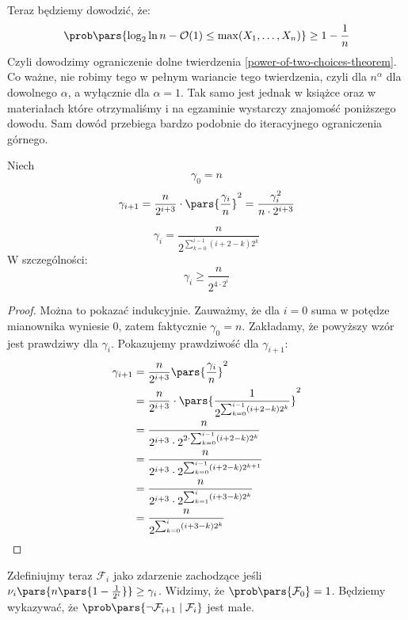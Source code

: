 Teraz będziemy dowodzić, że:
\[
	\prob\pars{\log_2\ln n - \mathcal{O}(1) \leq \max(X_1, \ldots, X_n)} \geq 1 - \frac{1}{n}
\]
Czyli dowodzimy ograniczenie dolne twierdzenia \ref{power-of-two-choices-theorem}. Co ważne, nie robimy tego w pełnym wariancie tego twierdzenia, czyli dla \(n^\alpha\) dla dowolnego \(\alpha\), a wyłącznie dla \(\alpha = 1\). Tak samo jest jednak w książce oraz w materiałach które otrzymaliśmy i na egzaminie wystarczy znajomość poniższego dowodu. Sam dowód przebiega bardzo podobnie do iteracyjnego ograniczenia górnego.

Niech
\[
	\gamma_0 = n
\]
\[
	\gamma_{i+1} = \frac{n}{2^{i+3}} \cdot \pars{\frac{\gamma_i}{n}}^2 = \frac{\gamma_i^2}{n \cdot 2^{i+3}}
\]
\begin{lemma}
	\label{two-choices-lowerbound-gamma-lemma}
	\[
		\gamma_i = \frac{n}{2^{\sum_{k = 0}^{i-1}(i + 2 - k)2^k}}
	\]
	W szczególności:
	\[
		\gamma_i \geq \frac{n}{2^{4 \cdot 2^i}}
	\]
\end{lemma}
\begin{proof}
	Można to pokazać indukcyjnie. Zauważmy, że dla \( i = 0 \) suma w potędze mianownika wyniesie 0, zatem faktycznie \( \gamma_0 = n \).
	Zakładamy, że powyższy wzór jest prawdziwy dla \( \gamma_i \). Pokazujemy prawdziwość dla \( \gamma_{i+1} \):
	\begin{align*}
		\gamma_{i+1} & = \frac{n}{2^{i+3}} \pars{\frac{\gamma_i}{n}}^2                                     \\
		             & = \frac{n}{2^{i+3}} \cdot \pars{\frac{1}{2^{\sum_{k = 0}^{i - 1}(i + 2 - k)2^k}}}^2 \\
		             & = \frac{n}{2^{i+3} \cdot 2^{2 \cdot \sum_{k = 0}^{i - 1}(i + 2 - k)2^k}}            \\
		             & = \frac{n}{2^{i+3} \cdot 2^{\sum_{k = 0}^{i - 1}(i + 2 - k)2^{k+1}}}                \\
		             & = \frac{n}{2^{i+3} \cdot 2^{\sum_{k = 1}^{i}(i + 3 - k)2^k}}                        \\
		             & = \frac{n}{2^{\sum_{k = 0}^i(i + 3 - k)2^k}}
	\end{align*}
\end{proof}

Zdefiniujmy teraz \( \mathcal{F}_i \) jako zdarzenie zachodzące jeśli \( \nu_i\pars{n\pars{1 - \frac{1}{2^i}}} \geq \gamma_i \). Widzimy, że \( \prob\pars{\mathcal{F}_0} = 1 \).
Będziemy wykazywać, że \( \prob\pars{\neg\mathcal{F}_{i+1} \mid \mathcal{F}_i} \) jest małe.

